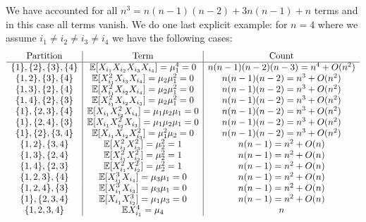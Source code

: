 We have accounted for all $n^3 = n(n-1)(n-2) + 3n(n-1) + n$ terms and in this case all terms vanish. We do one last explicit example: for $n = 4$ where   we assume $i_1 \ensuremath{\neq} i_2 \ensuremath{\neq} i_3 \ensuremath{\neq} i_4$ we have the following cases:
\[
\begin{array}{c | c | c}
\hbox{Partition} & \hbox{Term} & \hbox{Count} \\
\hline
\{1\}, \{2\}, \{3\}, \{4\} & {\mathbb E}[X_{i_1} X_{i_2} X_{i_3} X_{i_4}] = \mu_1^4 = 0 & n (n-1)(n-2)(n-3) = n^4 + O(n^2) \\
\{1,2\}, \{3\}, \{4\} & {\mathbb E}[X_{i_1}^2 X_{i_3} X_{i_4}] = \mu_2 \mu_1^2 = 0 & n(n-1)(n-2)= n^3 + O(n^2) \\
\{1,3\}, \{2\}, \{4\} & {\mathbb E}[X_{i_1}^2 X_{i_2} X_{i_4}] = \mu_2 \mu_1^2 = 0 & n(n-1)(n-2) = n^3 + O(n^2)\\
\{1,4\}, \{2\}, \{3\} & {\mathbb E}[X_{i_1}^2 X_{i_2} X_{i_3}] = \mu_2 \mu_1^2 = 0 & n(n-1)(n-2) = n^3 + O(n^2)\\
\{1\}, \{2,3\}, \{4\} & {\mathbb E}[X_{i_1} X_{i_2}^2 X_{i_4}] = \mu_1 \mu_2 \mu_1 = 0 & n(n-1)(n-2) = n^3 + O(n^2)\\
\{1\}, \{2,4\}, \{3\} & {\mathbb E}[X_{i_1} X_{i_2}^2 X_{i_3}] = \mu_1 \mu_2 \mu_1 = 0 & n(n-1)(n-2) = n^3 + O(n^2)\\
\{1\}, \{2\}, \{3,4\} & {\mathbb E}[X_{i_1} X_{i_2} X_{i_3}^2] = \mu_1^2 \mu_2  = 0 & n(n-1)(n-2) = n^3 + O(n^2)\\
\{1,2\}, \{3,4\} &  {\mathbb E}[X_{i_1}^2 X_{i_3}^2] =\mu_2^2 = 1 & n(n-1)=n^2 + O(n) \\
\{1,3\}, \{2,4\} &  {\mathbb E}[X_{i_1}^2 X_{i_2}^2] =\mu_2^2 = 1 & n(n-1)=n^2 + O(n) \\
\{1,4\}, \{2,3\} & {\mathbb E}[X_{i_1}^2 X_{i_2}^2] =\mu_2^2 = 1 & n(n-1)=n^2 + O(n) \\
\{1,2,3\}, \{4\} & {\mathbb E}[X_{i_1}^3 X_{i_4}] =\mu_3 \mu_1 = 0 & n(n-1) = n^2 + O(n) \\
\{1,2,4\}, \{3\} & {\mathbb E}[X_{i_1}^3 X_{i_3}] =\mu_3 \mu_1 = 0 & n(n-1) = n^2 + O(n) \\
\{1\}, \{2,3,4\} & {\mathbb E}[X_{i_1} X_{i_2}^3] = \mu_1 \mu_3 = 0 & n(n-1) = n^2 + O(n) \\
\{1,2,3,4\} & {\mathbb E} X_{i_1}^4 = \mu_4 & n
\end{array}
\]
